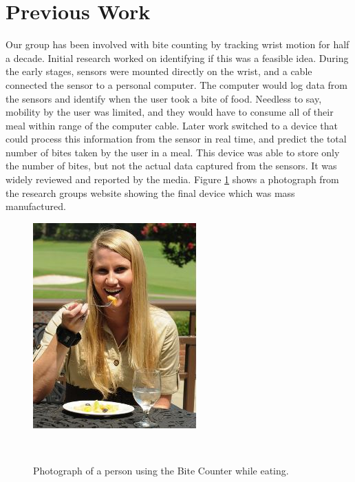 \section{Previous Work}
Our group has been involved with bite counting by tracking wrist motion for half a decade.
Initial research \cite{dong2012new} worked on identifying if this was a feasible idea.
During the early stages,
sensors were mounted directly on the wrist,
and a cable connected the sensor to a personal computer.
The computer would log data from the sensors and identify when the user took a bite of food.
Needless to say,
mobility by the user was limited,
and they would have to consume all of their meal within range of the computer cable.
Later work switched to a device that could process this information from the sensor in real time,
and predict the total number of bites taken by the user in a meal.
This device was able to store only the number of bites, 
but not the actual data captured from the sensors.
It was widely reviewed and reported by the media.
Figure \ref{Fig:BCEater} shows a photograph from the research groups website showing the final device which was mass manufactured.

\begin{figure}
        \centering
                \includegraphics[]{images/BCEater.JPG}

                \label{fig:gull}
        ~ %
         \caption{Photograph of a person using the Bite Counter while eating.}\label{Fig:BCEater}
\end{figure}

